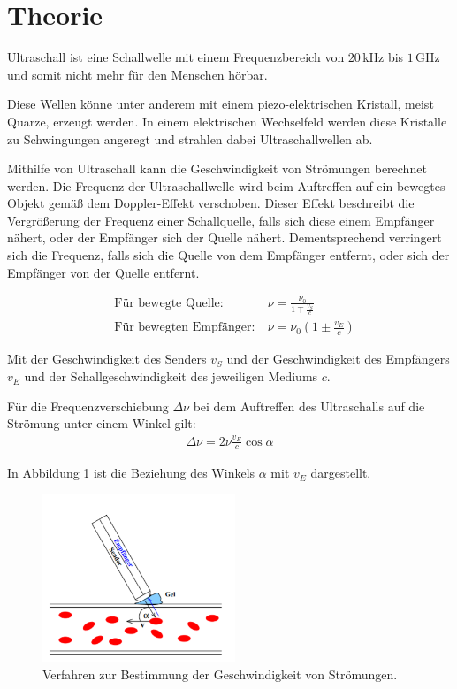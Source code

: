 \section{Theorie}
\label{sec:Theorie}

Ultraschall ist eine Schallwelle mit einem Frequenzbereich von $20\,$kHz bis $1\,$GHz und somit nicht mehr für den
Menschen hörbar.

Diese Wellen könne unter anderem mit einem piezo-elektrischen Kristall, meist Quarze, erzeugt werden. In einem elektrischen Wechselfeld werden
diese Kristalle zu Schwingungen angeregt und strahlen dabei Ultraschallwellen ab.

Mithilfe von Ultraschall kann die Geschwindigkeit von Strömungen berechnet werden. Die Frequenz der Ultraschallwelle wird beim Auftreffen auf ein bewegtes Objekt
gemäß dem Doppler-Effekt verschoben. Dieser Effekt beschreibt die Vergrößerung der Frequenz einer Schallquelle, falls sich diese einem Empfänger nähert, oder der
Empfänger sich der Quelle nähert. Dementsprechend verringert sich die Frequenz, falls sich die Quelle von dem Empfänger entfernt, oder sich
der Empfänger von der Quelle entfernt.

\begin{align}
  &\text{Für bewegte Quelle:} \: &\nu = \frac{\nu_0}{1 \mp \frac{v_S}{c}} \\
  &\text{Für bewegten Empfänger:} \: &\nu = \nu_0 \left(1 \pm \frac{v_E}{c}  \right)
\end{align}

Mit der Geschwindigkeit des Senders $v_S$ und der Geschwindigkeit des Empfängers $v_E$ und der Schallgeschwindigkeit des jeweiligen Mediums $c$.

Für die Frequenzverschiebung $\Delta \nu$ bei dem Auftreffen des Ultraschalls auf die Strömung unter einem Winkel gilt:
\begin{align}
  \Delta \nu = 2\nu \frac{v_E}{c}\cos{\alpha}
\end{align}

In Abbildung 1 ist die Beziehung des Winkels $\alpha$ mit $v_E$ dargestellt.

\begin{figure}[H]
  \centering
  \includegraphics[height=5cm]{winkel.PNG}
  \caption{Verfahren zur Bestimmung der Geschwindigkeit von Strömungen. \cite{sample}}
  \label{fig:Linienspektrum}
\end{figure}
